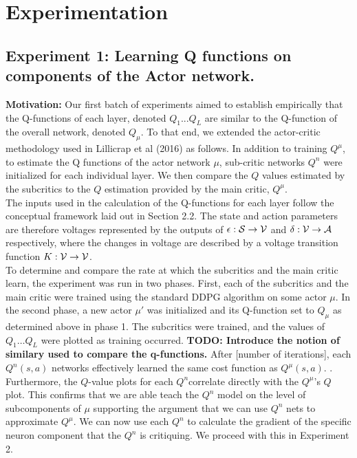 \section{Experimentation}
\subsection{Experiment 1: Learning Q functions on components of the Actor network.}

\textbf{Motivation:}
Our first batch of experiments aimed to establish empirically that the Q-functions of each layer, denoted $Q_1...Q_L$ are similar to the Q-function of the overall network, denoted $Q_{\mu}$. To that end, we extended the actor-critic methodology used in Lillicrap et al (2016) as follows. In addition to training $Q^\mu$, to estimate the Q functions of the actor network $\mu$, sub-critic networks $Q^n$ were initialized for each individual layer. We then compare the $Q$ values estimated by the subcritics to the $Q$ estimation provided by the main critic, $Q^\mu$. \\
\newline
The inputs used in the calculation of the Q-functions for each layer follow the conceptual framework laid out in Section 2.2. The state and action parameters are therefore voltages represented by the outputs of $\epsilon : {\mathcal S} \to {\mathcal V}$ and $\delta : {\mathcal V} \to {\mathcal A}$ respectively, where the changes in voltage are described by a voltage transition function $K : {\mathcal V} \to {\mathcal V}$. \\
\newline
To determine and compare the rate at which the subcritics and the main critic learn, the experiment was run in two phases. First, each of the subcritics and the main critic were trained using the standard DDPG algorithm on some actor $\mu$. In the second phase, a new actor $\mu'$ was initialized and its Q-function set to $Q_{\mu}$ as determined above in phase 1. The subcritics were trained, and the values of $Q_1\dots Q_{L}$ were plotted as training occurred. \textbf{TODO: Introduce the notion of similary used to compare the q-functions.}
\newline
After [number of iterations], each $Q^n(s,a)$  networks effectively learned the same cost function as $Q^{\mu}(s,a)$.
. Furthermore, the $Q$-value plots for each $Q^n$correlate directly with the  $Q^{\mu}$'s $Q$ plot. This confirms that we are able teach the $Q^n$ model on the level of subcomponents of $\mu$ supporting the argument that we can use $Q^n$ nets to approximate $Q^\mu$. We can now use each $Q^n$ to calculate the gradient of the specific neuron component that the $Q^n$ is critiquing. We proceed with this in Experiment 2.
